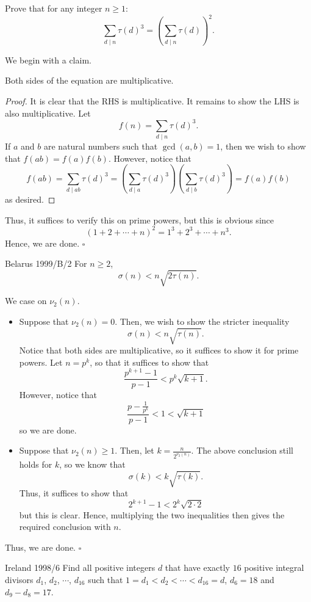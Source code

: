 \documentclass{article}
\begin{document}
\begin{problem}[3.7.8]{}
Prove that for any integer $n \ge 1$: \[\sum_{d \mid n}\tau(d)^3 = \left(\sum_{d \mid n}\tau(d)\right)^2.\]
\end{problem}

We begin with a claim.
\begin{claim*}
Both sides of the equation are multiplicative.
\end{claim*}
\begin{proof}
It is clear that the RHS is multiplicative. It remains to show the LHS is also multiplicative. Let \[f(n) = \sum_{d \mid n}\tau(d)^3.\] If $a$ and $b$ are natural numbers such that $\gcd(a, b) = 1$, then we wish to show that $f(ab) = f(a)f(b)$. However, notice that \[f(ab) = \sum_{d \mid ab}\tau(d)^3 = \left(\sum_{d \mid a}\tau(d)^3\right)\left(\sum_{d \mid b}\tau(d)^3\right) = f(a)f(b)\] as desired.
\end{proof}

Thus, it suffices to verify this on prime powers, but this is obvious since \[(1+2+\cdots+n)^2 = 1^3+2^3+\cdots+n^3.\] Hence, we are done. $\square$

\begin{problem}[3.7.9]{Belarus 1999/B/2}
For $n \ge 2$, \[\sigma(n) < n\sqrt{2\tau(n)}.\]
\end{problem}

We case on $\nu_2(n)$.

\begin{itemize}
\item Suppose that $\nu_2(n) = 0$. Then, we wish to show the stricter inequality \[\sigma(n) < n\sqrt{\tau(n)}.\] Notice that both sides are multiplicative, so it suffices to show it for prime powers. Let $n = p^k$, so that it suffices to show that \[\dfrac{p^{k+1}-1}{p-1} < p^k\sqrt{k+1}.\] However, notice that \[\dfrac{p-\tfrac{1}{p^k}}{p-1} < 1 < \sqrt{k+1}\] so we are done.
\item Suppose that $\nu_2(n) \ge 1$. Then, let $k = \tfrac{n}{2^{\nu_2(n)}}$. The above conclusion still holds for $k$, so we know that \[\sigma(k) < k\sqrt{\tau(k)}.\] Thus, it suffices to show that \[2^{k+1}-1 < 2^k\sqrt{2\cdot 2}\] but this is clear. Hence, multiplying the two inequalities then gives the required conclusion with $n$.
\end{itemize}

Thus, we are done. $\square$

\begin{problem}[3.7.10]{Ireland 1998/6}
Find all positive integers $d$ that have exactly $16$ positive integral divisors $d_1$, $d_2$, $\cdots$, $d_{16}$ such that $1 = d_1 < d_2 < \cdots < d_{16} = d$, $d_6 = 18$ and $d_9 - d_8 = 17$.
\end{problem}
\end{document}

